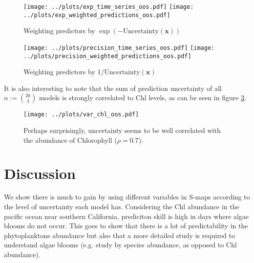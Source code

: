 \documentclass[fleqn,10pt]{wlscirep}
\newcommand{\un}{\text{Uncertainty}}
\newcommand{\x}{\mathbf{x}}
\begin{document}
\begin{figure}[ht]
\centering
\texttt{[image: ../plots/exp\_time\_series\_oos.pdf]}
\texttt{[image: ../plots/exp\_weighted\_predictions\_oos.pdf]}
\caption{Weighting predictors by $\exp \left ( -\un (\x) \right )$}
\label{fig:exp}
\end{figure}

\begin{figure}[ht]
  \centering
\texttt{[image: ../plots/precision\_time\_series\_oos.pdf]}
\texttt{[image: ../plots/precision\_weighted\_predictions\_oos.pdf]}
\caption{Weighting predictors by $1 / \un (\x)$}
\label{fig:prec}
\end{figure}

It is also interesting to note that the sum of prediction uncertainty
of all $n:=\binom{20}{3}$ models is strongly correlated to Chl levels, as
can be seen in figure \ref{fig:var chl}.

\begin{figure}[ht]
\centering
\texttt{[image: ../plots/var\_chl\_oos.pdf]}
\caption{Perhaps surprisingly, uncertainty seems to be well correlated
  with the abundance of Chlorophyll ($\rho = 0.7$).}
\label{fig:var chl}
\end{figure}

\section{Discussion}
We show there is much to gain by using different variables in S-maps
according to the level of uncertainty each model has. Considering the
Chl abundance in the pacific ocean near southern California,
prediciton skill is high in days where algae blooms do not occur. This
goes to show that there is a lot of predictability in the
phytoplanktons abundance but also that a more detailed study is
required to understand algae blooms (e.g. study by species abundance,
as opposed to Chl abundance).
\end{document}
